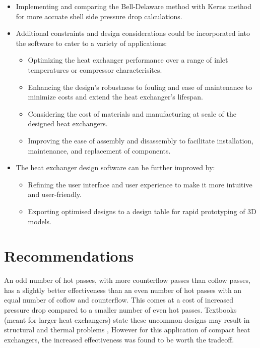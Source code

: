\documentclass{article}
\begin{document}
\begin{itemize}
    \item Implementing and comparing the Bell-Delaware method with Kerns method for more accuate shell side pressure drop calculations.
    \item Additional constraints and design considerations could be incorporated into the software to cater to a variety of applications:
    \begin{itemize}
        \item Optimizing the heat exchanger performance over a range of inlet temperatures or compressor characterisitcs.
        \item Enhancing the design's robustness to fouling and ease of maintenance to minimize costs and extend the heat exchanger's lifespan.
        \item Considering the cost of materials and manufacturing at scale of the designed heat exchangers.
        \item Improving the ease of assembly and disassembly to facilitate installation, maintenance, and replacement of components.
    \end{itemize}

    \item The heat exchanger design software can be further improved by:
    \begin{itemize}
        \item Refining the user interface and user experience to make it more intuitive and user-friendly.
        \item Exporting optimised designs to a design table for rapid prototyping of 3D models.
    \end{itemize}
\end{itemize}


\section{Recommendations}

An odd number of hot passes, with more counterflow passes than coflow passes, has a slightly better effectiveness
than an even number of hot passes with an equal number of coflow and counterflow.
This comes at a cost of increased pressure drop compared to a smaller number of even hot passes.
Textbooks (meant for larger heat exchangers) state these uncommon designs may result in structural and thermal problems \cite{},
However for this application of compact heat exchangers, the increased effectiveness was found to be worth the tradeoff.
\end{document}
